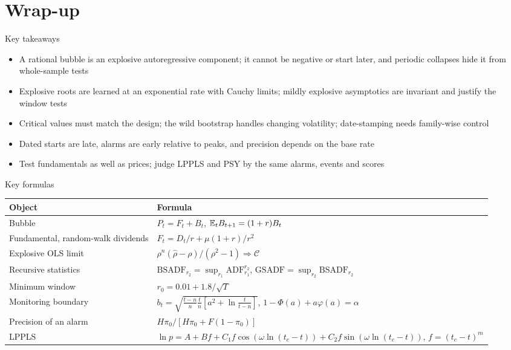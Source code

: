 \section{Wrap-up}

\begin{frame}{Key takeaways}
\itemsize{\small}
\begin{itemize}
    \item A rational bubble is an explosive autoregressive component; it cannot be negative or start later, and periodic collapses hide it from whole-sample tests
    \item Explosive roots are learned at an exponential rate with Cauchy limits; mildly explosive asymptotics are invariant and justify the window tests
    \item Critical values must match the design; the wild bootstrap handles changing volatility; date-stamping needs family-wise control
    \item Dated starts are late, alarms are early relative to peaks, and precision depends on the base rate
    \item Test fundamentals as well as prices; judge LPPLS and PSY by the same alarms, events and scores
\end{itemize}
\end{frame}

\begin{frame}{Key formulas}
\itemsize{\small}
{\renewcommand{\arraystretch}{1.4}\begin{center}
\footnotesize
\begin{tabular}{ll}
\toprule
\textbf{Object} & \textbf{Formula} \\
\midrule
Bubble & $P_t = F_t + B_t$, $\mathbb{E}_t B_{t+1} = (1 + r)B_t$ \\
Fundamental, random-walk dividends & $F_t = D_t/r + \mu(1 + r)/r^2$ \\
Explosive OLS limit & $\rho^n(\hat\rho - \rho)/(\rho^2 - 1) \Rightarrow \mathcal C$ \\
Recursive statistics & $\mathrm{BSADF}_{r_2} = \sup_{r_1}\mathrm{ADF}_{r_1}^{r_2}$, $\mathrm{GSADF} = \sup_{r_2}\mathrm{BSADF}_{r_2}$ \\
Minimum window & $r_0 = 0.01 + 1.8/\sqrt T$ \\
Monitoring boundary & $b_t = \sqrt{\tfrac{t - n}{n}\tfrac{t}{n}[a^2 + \ln\tfrac{t}{t - n}]}$, $1 - \Phi(a) + a\varphi(a) = \alpha$ \\
Precision of an alarm & $H\pi_0/[H\pi_0 + F(1 - \pi_0)]$ \\
LPPLS & $\ln p = A + B f + C_1 f\cos(\omega\ln(t_c - t)) + C_2 f\sin(\omega\ln(t_c - t))$, $f = (t_c - t)^m$ \\
\bottomrule
\end{tabular}
\end{center}
}
\end{frame}

